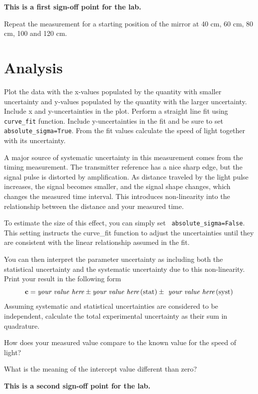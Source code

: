  \textbf{This is a first sign-off point for the lab.}

\begin{measurement} Repeat the measurement for a starting position of the
mirror at 40 cm, 60 cm, 80 cm, 100 and 120 cm. 
\end{measurement}

\section{Analysis}

\begin{plot} Plot the data with the x-values populated by the
quantity with smaller uncertainty and y-values populated by the
quantity with the larger uncertainty. Include x and y-uncertainties in
the plot. Perform a straight line fit using {\tt curve{\_}fit}
function. Include y-uncertainties in the fit and be sure to set {\tt absolute{\_}sigma=True}.  From the fit values
calculate the speed of light together with its uncertainty. \end{plot}

A major source of systematic uncertainty in this measurement comes
from the timing measurement.  The transmitter reference has a nice
sharp edge, but the signal pulse is distorted by amplification.  As
distance traveled by the light pulse increases, the signal becomes
smaller, and the signal shape changes, which changes the measured time
interval.  This introduces non-linearity into the relationship between
the distance and your measured time.

\begin{plot} To estimate the size of this effect, you can simply set {\tt
  absolute{\_}sigma=False}.  This setting instructs the {\rm curve{\_}fit}
function to adjust the uncertainties until they are consistent with
the linear relationship assumed in the fit. 
\end{plot}
\begin{print}  You can then interpret
the parameter uncertainty as including both the statistical
uncertainty and the systematic uncertainty due to this non-linearity.  Print your result in the following form 
\begin{displaymath}
 \textbf{c}= \textit{your value here} \pm \textit{your value here} \,  ({\rm stat}) \pm\textit{ your value here} \, ({\rm syst})
\end{displaymath}
Assuming systematic and statistical uncertainties are considered to be independent, calculate the total experimental uncertainty as their sum in quadrature. 
\end{print}

\begin{print} 
How does your measured value compare to the known value for the speed of light?
\end{print}

\begin{print} 
What is the meaning of the intercept value different than zero? 
\end{print}

\textbf{This is a second sign-off point for the lab.}